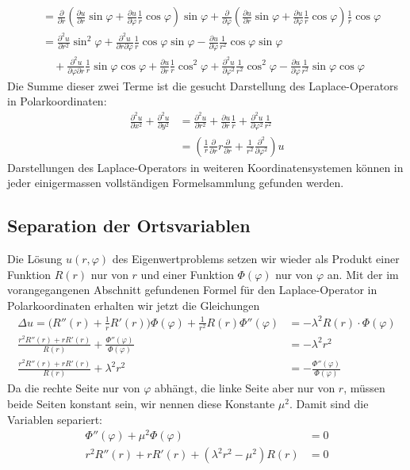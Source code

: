 \begin{align*}
&=
\frac{\partial}{\partial r}
\left(
\frac{\partial u}{\partial r}
\sin\varphi
+
\frac{\partial u}{\partial\varphi}
\frac1r\cos\varphi
\right)
\sin\varphi
+
\frac{\partial}{\partial \varphi}
\left(
\frac{\partial u}{\partial r}
\sin\varphi
+
\frac{\partial u}{\partial\varphi}
\frac1r\cos\varphi
\right)
\frac1r\cos\varphi
\\
&=
\frac{\partial^2u}{\partial r^2}\sin^2\varphi
+\frac{\partial^2u}{\partial r\partial\varphi}\frac1r\cos\varphi\sin\varphi
-\frac{\partial u}{\partial\varphi}\frac1{r^2}\cos\varphi\sin\varphi
\\
&\quad
+
\frac{\partial^2u}{\partial\varphi\partial r}\frac1r\sin\varphi\cos\varphi
+\frac{\partial u}{\partial r}\frac1r\cos^2\varphi
+\frac{\partial^2u}{\partial \varphi^2}\frac1{r^2}\cos^2\varphi
-\frac{\partial u}{\partial \varphi}\frac1{r^2}\sin\varphi\cos\varphi
\end{align*}
Die Summe dieser zwei Terme ist die gesucht Darstellung des Laplace-Operators
in Polarkoordinaten:
\begin{align*}
\frac{\partial^2u}{\partial x^2}+\frac{\partial^2u}{\partial y^2}
&=
\frac{\partial^2u}{\partial r^2}
+\frac{\partial u}{\partial r}\frac1r
+\frac{\partial^2u}{\partial\varphi^2}\frac1{r^2}
\\
&=
\left(\frac1r\frac{\partial}{\partial r}r\frac{\partial}{\partial r}+\frac1{r^2}\frac{\partial^2}{\partial \varphi^2}\right)u
\end{align*}
Darstellungen des Laplace-Operators in weiteren Koordinatensystemen können
in jeder einigermassen vollständigen Formelsammlung gefunden werden.

\subsection{Separation der Ortsvariablen}
Die Lösung $u(r,\varphi)$ des Eigenwertproblems setzen wir wieder
als Produkt einer Funktion
$R(r)$
nur von  $r$ und einer Funktion $\Phi(\varphi)$ nur von $\varphi$ an.
Mit der im vorangegangenen Abschnitt gefundenen Formel für den Laplace-Operator
in Polarkoordinaten erhalten wir jetzt die Gleichungen
\begin{align*}
\Delta u=
\biggl(R''(r) + \frac1rR'(r)\biggr)\Phi(\varphi)
+\frac1{r^2}R(r)\Phi''(\varphi)&=-\lambda^2 R(r)\cdot\Phi(\varphi)\\
\frac{r^2R''(r)+rR'(r)}{R(r)}+\frac{\Phi''(\varphi)}{\Phi(\varphi)}
&=-\lambda^2 r^2
\\
\frac{r^2R''(r)+rR'(r)}{R(r)}+\lambda^2 r^2&=-\frac{\Phi''(\varphi)}{\Phi(\varphi)}
\end{align*}
Da die rechte Seite nur von $\varphi$ abhängt, die linke Seite aber nur von $r$,
müssen beide Seiten konstant sein, wir nennen diese Konstante $\mu^2$.
Damit sind die Variablen separiert:
\begin{align}
\Phi''(\varphi)+\mu^2\Phi(\varphi)&=0\label{phigleichung}\\
r^2R''(r)+rR'(r)+(\lambda^2 r^2-\mu^2)R(r)&=0\label{rgleichung}
\end{align}

